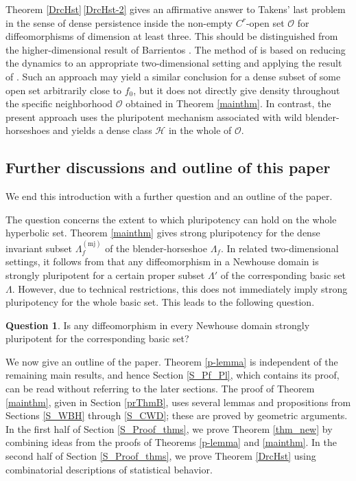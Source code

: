 \documentclass{amsart}
\theoremstyle{definition}
\newtheorem{op}[thm]{Question}
\numberwithin{equation}{section}
\numberwithin{figure}{section}
\begin{document}
Theorem \ref{DrcHst}\,\eqref{DrcHst-2} gives an affirmative answer to 
Takens' last problem in the sense of dense persistence inside the non-empty $C^r$-open set $\mathcal{O}$ for diffeomorphisms of dimension at least three. 
This should be distinguished from the higher-dimensional result of Barrientos \cite{B22}. 
The method of \cite{B22} is based on reducing the dynamics to an appropriate two-dimensional setting and applying the result of \cite{KS17}. 
Such an approach may yield a similar conclusion for a dense subset of some open set arbitrarily close to $f_0$, but it does not directly give density throughout the specific neighborhood $\mathcal{O}$ obtained in Theorem \ref{mainthm}. 
In contrast, the present approach uses the pluripotent mechanism associated with wild blender-horseshoes and yields a dense class $\mathcal{H}$ in the whole of $\mathcal{O}$.

\subsection{Further discussions and outline of this paper}
We end this introduction with a further question and an outline of the paper.

The question concerns the extent to which pluripotency can hold on the whole hyperbolic set. 
Theorem \ref{mainthm} gives strong pluripotency for the dense invariant subset $\Lambda_f^{(\mathrm{mj})}$ of the blender-horseshoe $\Lambda_f$. 
In related two-dimensional settings, it follows from \cite{KS17} that any diffeomorphism in a Newhouse domain is strongly pluripotent for a certain proper subset $\Lambda'$ of the corresponding basic set $\Lambda$. 
However, due to technical restrictions, this does not immediately imply strong pluripotency for the whole basic set. 
This leads to the following question.

\begin{op}\label{op_pluri2} 
Is any diffeomorphism in every Newhouse domain strongly pluripotent for the corresponding basic set?
\end{op}

\medskip

We now give an outline of the paper.
Theorem \ref{p-lemma} is independent of the remaining main results, and hence Section \ref{S_Pf_Pl}, which contains its proof, can be read without referring to the later sections. 
The proof of Theorem \ref{mainthm}, given in Section \ref{prThmB}, uses several lemmas and propositions from Sections \ref{S_WBH} through \ref{S_CWD}; these are proved by geometric arguments. 
In the first half of Section \ref{S_Proof_thms}, we prove Theorem \ref{thm_new} by combining ideas from the proofs of Theorems \ref{p-lemma} and \ref{mainthm}. 
In the second half of Section \ref{S_Proof_thms}, we prove Theorem \ref{DrcHst} using combinatorial descriptions of statistical behavior.
\end{document}
